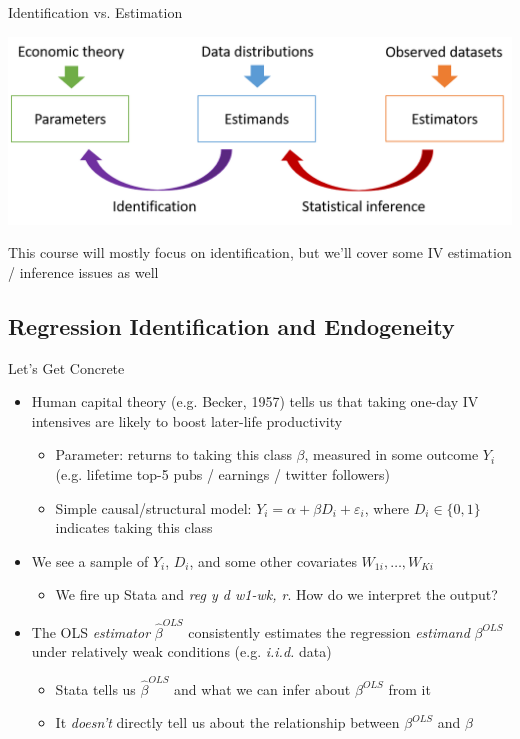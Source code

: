 \documentclass{beamer}
\begin{document}
\begin{frame}{Identification vs. Estimation}
\smallskip

\includegraphics[scale=0.37]{./lecture_includes/BigPicture.png}
\medskip

This course will mostly focus on identification, but we'll cover some IV estimation / inference issues as well
\end{frame}

\subsection{Regression Identification and Endogeneity}
\begin{frame}{Let's Get Concrete}
\begin{itemize}
\item Human capital theory (e.g. Becker, 1957) tells us that taking one-day IV intensives are likely to boost later-life productivity\pause{}\smallskip
\begin{itemize}
\item Parameter: returns to taking this class $\beta$, measured in some outcome $Y_i$ (e.g. lifetime top-5 pubs / earnings / twitter followers)\smallskip
\item Simple causal/structural model: $Y_i=\alpha+\beta D_i + \varepsilon_i$, where $D_i\in\{0,1\}$ indicates taking this class
\end{itemize}\pause\smallskip
\item We see a sample of $Y_i$, $D_i$, and some other covariates $W_{1i},\dots,W_{Ki}$\smallskip
\begin{itemize}
\item We fire up Stata and \emph{reg y d w1-wk, r}. How do we interpret the output?
\end{itemize}\pause{}\medskip
\item The OLS \emph{estimator} $\widehat{\beta}^{OLS}$ consistently estimates the regression \emph{estimand} $\beta^{OLS}$ under relatively weak conditions (e.g. \emph{i.i.d.} data)\smallskip
\begin{itemize}
\item Stata tells us $\widehat{\beta}^{OLS}$ and what we can infer about $\beta^{OLS}$ from it\smallskip
\item It \emph{doesn't} directly tell us about the relationship between $\beta^{OLS}$ and $\beta$
\end{itemize}
\end{itemize}
\end{frame}
\end{document}
